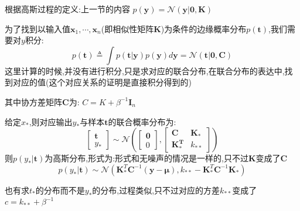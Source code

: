 \documentclass[UTF8,a4paper]{ctexart}
\begin{document}
            根据高斯过程的定义:{\color{blue}上一节的内容}
            $p(\bm y) = \mathcal N(\bm y | \bm 0,\bm K)$

            为了找到以输入值$\bm x_1 , \cdots,\bm x_n$(即相似性矩阵$\bm K$)为条件的边缘概率分布$p(\bm t)$,我们需要对$y$积分:
            \begin{equation}
                p(\bm t) \triangleq \int p(\bm t|\bm y)p(\bm y)d\bm y = \mathcal{N}(\bm t|\bm 0,\bm C)
            \end{equation}
            {\color{blue}这里计算的时候,并没有进行积分,只是求对应的联合分布,在联合分布的表达中,找到对应的值(这个对应关系的证明是直接积分得到的)}

            其中协方差矩阵$\bm C$为:
            $C = K + \beta^{-1}\bm I_n$

            给定$x_*$,则对应输出$y_*$与样本$\bm t$的联合概率分布为:
            \begin{equation}
                \left [ \begin{array}{c}
                    \bm{t} \\ y_*
                \end{array} \right ] \sim \mathcal{N}
                \left (
                    \left [\begin{array}{c}
                    \bm{0} \\ 0
                    \end{array} \right ] ,
                    \left [\begin{array}{cc}
                    \bm{C} & \bm{K_*} \\
                    \bm{K_*^T} & k_{**}
                    \end{array} \right ]
                \right )
            \end{equation}
            则$p(y_*|\bm t)$为高斯分布,形式为:{\color{blue}形式和无噪声的情况是一样的,只不过$\bm K$变成了$\bm C$}
            \begin{equation}
                p(y_*|\bm t) \sim \mathcal N (\bm K_*^T\bm C^{-1}(\bm y - \bm \mu),k_{**} - \bm K_*^T\bm C^{-1}\bm K_*)
            \end{equation}

            {\color{blue}也有求$t_*$的分布而不是$y_*$的分布,过程类似,只不过对应的方差$k_{**}$变成了$c = k_{**} + \beta^{-1}$}
\end{document}
